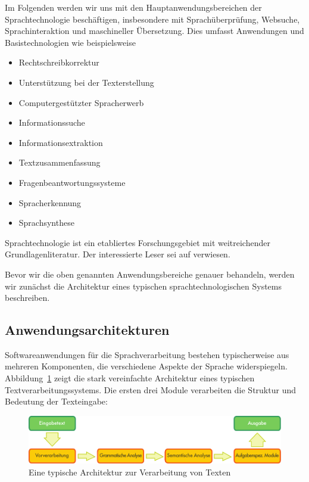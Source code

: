 \documentclass[]{../../metanetpaper}
\begin{document}
\begin{multicols}{2}
Im Folgenden werden wir uns mit den Hauptanwendungsbereichen der Sprachtechnologie beschäftigen, insbesondere mit Sprachüberprüfung, Websuche, Sprach\-inter\-aktion und maschineller Übersetzung. Dies umfasst Anwendungen und Basistechnologien wie beispielsweise

\begin{itemize}
\item Rechtschreibkorrektur
\item Unterstützung bei der Texterstellung
\item Computergestützter Spracherwerb
\item Informationssuche
\item Informationsextraktion
\item Textzusammenfassung
\item Fragenbeantwortungssysteme
\item Spracherkennung 
\item Sprachsynthese
\end{itemize}

Sprachtechnologie ist ein etabliertes Forschungsgebiet mit weitreichender Grundlagenliteratur. Der interessierte Leser sei auf \cite{carstensen-etal1} \cite{jurafsky-martin01} \cite{manning-schuetze1} \cite{lt-world1} \cite{lt-survey1} verwiesen.

Bevor wir die oben genannten Anwendungsbereiche genauer behandeln, werden wir zunächst die Architektur eines typischen sprachtechnologischen Systems beschreiben. 

\subsection{Anwendungsarchitekturen}

Softwareanwendungen für die Sprachverarbeitung bestehen typischerweise aus mehreren Komponenten, die verschiedene Aspekte der Sprache widerspiegeln. Abbildung~\ref{fig:textprocessingarch_de} zeigt die stark vereinfachte Architektur eines typischen Textverarbeitungssystems. Die ersten drei Module verarbeiten die Struktur und Bedeutung der Texteingabe:

\begin{figure}[htb]
  \center
  \vspace{-5mm} \includegraphics[width=\textwidth]{../_media/german/text_processing_app_architecture}
  \caption{Eine typische Architektur zur Verarbeitung von Texten}
  \label{fig:textprocessingarch_de}
\end{figure}


\end{multicols}
\end{document}
